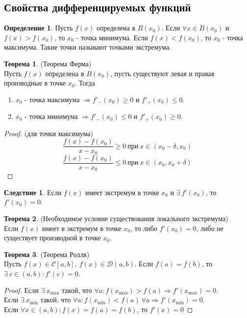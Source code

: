 \documentclass[a4paper, 12pt]{article}
\theoremstyle{definition}
\newtheorem*{definition}{Определение}
\newtheorem*{theorem}{Теорема}
\newtheorem*{consequense}{Следствие}
\begin{document}
        \subsection{Свойства дифференцируемых функций}
        \begin{definition}
            Пусть $f(x)$ определена в $B(x_0)$. Если  $\forall x\in \mathring{B}(x_0)$ и\\
            $f(x)>f(x_0)$, то $x_0$ - точка минимума. Если $f(x)<f(x_0)$, то $x_0$ - точка максимума. Такие точки называют точками экстремума.
        \end{definition} 
        \begin{theorem} (Теорема Ферма)\\
            Пусть $f(x)$ определена в $B(x_0)$, пусть существуют левая и правая производные в точке $x_0$. Тогда
            \begin{enumerate}
                \item $x_0$ - точка максимума $\Rightarrow f'_-(x_0)\geq 0$ и $f'_+(x_0)\leq 0$.
                \item $x_0$ - точка минимума $\Rightarrow f'_-(x_0)\leq 0$ и $f'_+(x_0)\geq 0$.
            \end{enumerate}
        \end{theorem} 
        \begin{proof} (для точки максимума)
                \[\frac{f(x)-f(x_0)}{x-x_0}\geq 0\ \text{при}\ x\in (x_0-\delta,x_0)\]
                \[\frac{f(x)-f(x_0)}{x-x_0}\leq 0\ \text{при}\ x\in (x_0,x_0+\delta)\]
        \end{proof} 
        \begin{consequense}
            Если $f(x)$ имеет экстремум в точке $x_0$ и $\exists\ f'(x_0)$, то $f'(x_0)=0$.
        \end{consequense} 
        \begin{theorem} (Необходимое условие существования локального экстремума)\\
            Если $f(x)$ имеет в экстремум в точке $x_0$, то либо $f'(x_0)=0$, либо не существует производной в точке $x_0$.
        \end{theorem} 
        \begin{theorem} (Теорема Ролля)\\
            Пусть $f(x)\in \mathcal{C}[a,b],\ f(x)\in \mathcal{D}(a,b)$. Если $f(a)=f(b)$, то $\exists\ c\in (a,b): f'(c)=0$.
        \end{theorem} 
        \begin{proof}
            Если $\exists\ x_{\max}$ такой, что $\forall a: f(x_{\max})>f(a) \Rightarrow f'(x_{\max})=0$.\\
            Если $\exists\ x_{\min}$ такой, что $\forall a: f(x_{\min})<f(a)\ \forall a \Rightarrow f'(x_{\min})=0$.\\
            Если $\forall x\in (a,b): f(x)=f(a)=f(b)$, то $f'(x)=0$
        \end{proof}
\end{document}
